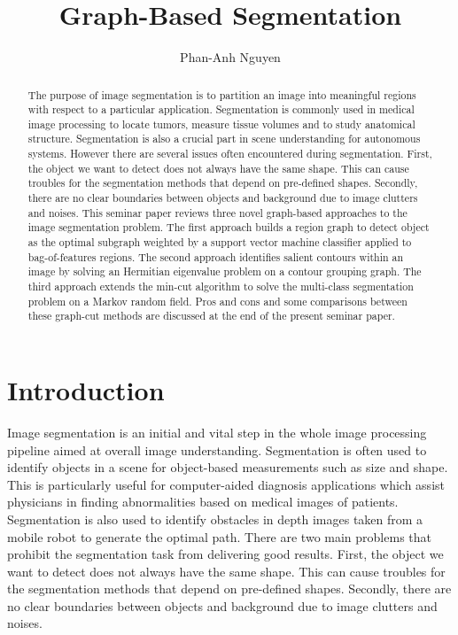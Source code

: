 \documentclass{SMBV13}
\begin{document}
\title{Graph-Based Segmentation}

\author{Phan-Anh Nguyen}

\maketitle


\begin{abstract}%
The purpose of image segmentation is to partition an image into meaningful regions with respect to a particular application. Segmentation is commonly used in medical image processing to locate tumors, measure tissue volumes and to study anatomical structure. Segmentation is also a crucial part in scene understanding for autonomous systems. However there are several issues often encountered during segmentation. First, the object we want to detect does not always have the same shape. This can cause troubles for the segmentation methods that depend on pre-defined shapes. Secondly, there are no clear boundaries between objects and background due to image clutters and noises. This seminar paper reviews three novel graph-based approaches to the image segmentation problem. The first approach builds a region graph to detect object as the optimal subgraph weighted by a support vector machine classifier applied to bag-of-features regions. The second approach identifies salient contours within an image by solving an Hermitian eigenvalue problem on a contour grouping graph. The third approach extends the min-cut algorithm to solve the multi-class segmentation problem on a Markov random field. Pros and cons and some comparisons between these graph-cut methods are discussed at the end of the present seminar paper.
\end{abstract}


%
\section{Introduction}

Image segmentation is an initial and vital step in the whole image processing pipeline aimed at overall image understanding. Segmentation is often used to identify objects in a scene for object-based measurements such as size and shape. This is particularly useful for computer-aided diagnosis applications which assist physicians in finding abnormalities based on medical images of patients. Segmentation is also used to identify obstacles in depth images taken from a mobile robot to generate the optimal path. There are two main problems that prohibit the segmentation task from delivering good results. First, the object we want to detect does not always have the same shape. This can cause troubles for the segmentation methods that depend on pre-defined shapes. Secondly, there are no clear boundaries between objects and background due to image clutters and noises.
\end{document}
